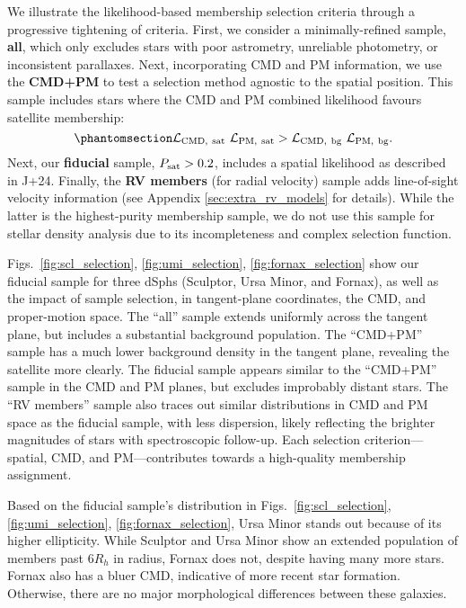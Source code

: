 We illustrate the likelihood-based membership selection criteria through
a progressive tightening of criteria. First, we consider a
minimally-refined sample, \textbf{all}, which only excludes stars with
poor astrometry, unreliable photometry, or inconsistent parallaxes.
Next, incorporating CMD and PM information, we use the \textbf{CMD+PM}
to test a selection method agnostic to the spatial position. This sample
includes stars where the CMD and PM combined likelihood favours
satellite membership:
\begin{equation}\protect\phantomsection\label{eq:sel_cmd_pm}{
{\cal L}_{\rm CMD,\ sat}\ {\cal L}_{\rm PM,\ sat} > {\cal L}_{\rm CMD,\ bg}\ {\cal L}_{\rm PM,\ bg}.
}\end{equation} Next, our \textbf{fiducial} sample,
\(P_{\rm sat} > 0.2\), includes a spatial likelihood as described in
J+24. Finally, the \textbf{RV members} (for radial velocity) sample adds
line-of-sight velocity information (see Appendix
\ref{sec:extra_rv_models} for details). While the latter is the
highest-purity membership sample, we do not use this sample for stellar
density analysis due to its incompleteness and complex selection
function.

Figs.~\ref{fig:scl_selection}, \ref{fig:umi_selection}, \ref{fig:fornax_selection}
show our fiducial sample for three dSphs (Sculptor, Ursa Minor, and
Fornax), as well as the impact of sample selection, in tangent-plane
coordinates, the CMD, and proper-motion space. The ``all'' sample
extends uniformly across the tangent plane, but includes a substantial
background population. The ``CMD+PM'' sample has a much lower background
density in the tangent plane, revealing the satellite more clearly. The
fiducial sample appears similar to the ``CMD+PM'' sample in the CMD and
PM planes, but excludes improbably distant stars. The ``RV members''
sample also traces out similar distributions in CMD and PM space as the
fiducial sample, with less dispersion, likely reflecting the brighter
magnitudes of stars with spectroscopic follow-up. Each selection
criterion---spatial, CMD, and PM---contributes towards a high-quality
membership assignment.

Based on the fiducial sample's distribution in
Figs.~\ref{fig:scl_selection}, \ref{fig:umi_selection}, \ref{fig:fornax_selection},
Ursa Minor stands out because of its higher ellipticity. While Sculptor
and Ursa Minor show an extended population of members past \(6R_h\) in
radius, Fornax does not, despite having many more stars. Fornax also has
a bluer CMD, indicative of more recent star formation. Otherwise, there
are no major morphological differences between these galaxies.

